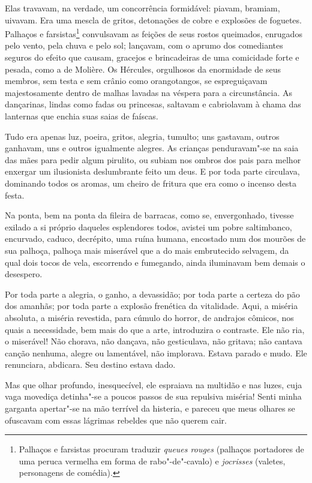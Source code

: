 Elas travavam, na verdade, um concorrência formidável: piavam, bramiam,
uivavam. Era uma mescla de gritos, detonações de cobre e explosões de
foguetes. Palhaços e farsistas\protect\footnote{ Palhaços e farsistas procuram 
traduzir \textit{queues rouges} (palhaços
portadores de uma peruca vermelha em forma de rabo"-de"-cavalo) e
\textit{jocrisses} (valetes, personagens de comédia).} convulsavam as feições
de seus rostos queimados, enrugados pelo vento, pela chuva e pelo sol;
lançavam, com o aprumo dos comediantes seguros do efeito que causam,
gracejos e brincadeiras de uma comicidade forte e pesada, como a de
Molière. Os Hércules, orgulhosos da enormidade de seus membros, sem
testa e sem crânio como orangotangos, se espreguiçavam
majestosamente dentro de malhas lavadas na véspera para a circunstância. As
dançarinas, lindas como fadas ou princesas, saltavam e cabriolavam à
chama das lanternas que enchia suas saias de faíscas.

Tudo era apenas luz, poeira, gritos, alegria, tumulto; uns gastavam,
outros ganhavam, uns e outros igualmente alegres. As crianças
penduravam"-se na saia das mães para pedir algum pirulito, ou
subiam nos ombros dos pais para melhor enxergar um ilusionista
deslumbrante feito um deus. E por toda parte circulava, dominando todos
os aromas, um cheiro de fritura que era como o incenso desta festa.

Na ponta, bem na ponta da fileira de barracas, como se,
envergonhado, tivesse exilado a si próprio daqueles esplendores todos,
avistei um pobre saltimbanco, encurvado, caduco, decrépito, uma
ruína humana, encostado num dos mourões de sua palhoça, palhoça
mais miserável que a do mais embrutecido selvagem, da qual dois tocos
de vela, escorrendo e fumegando, ainda iluminavam bem demais o
desespero.

Por toda parte a alegria, o ganho, a devassidão; por toda parte a
certeza do pão dos amanhãs; por toda parte a explosão frenética da
vitalidade. Aqui, a miséria absoluta, a miséria revestida, para cúmulo
do horror, de andrajos cômicos, nos quais a necessidade, bem mais do
que a arte, introduzira o contraste. Ele não ria, o miserável! Não
chorava, não dançava, não gesticulava, não gritava; não cantava canção nenhuma, alegre ou lamentável, não implorava. Estava parado e
mudo. Ele renunciara, abdicara. Seu destino estava
dado.

Mas que olhar profundo, inesquecível, ele espraiava na multidão e
nas luzes, cuja vaga movediça detinha"-se a poucos passos de sua repulsiva
miséria! Senti minha garganta apertar"-se na mão terrível da histeria,
e pareceu que meus olhares se ofuscavam com essas lágrimas
rebeldes que não querem cair.

